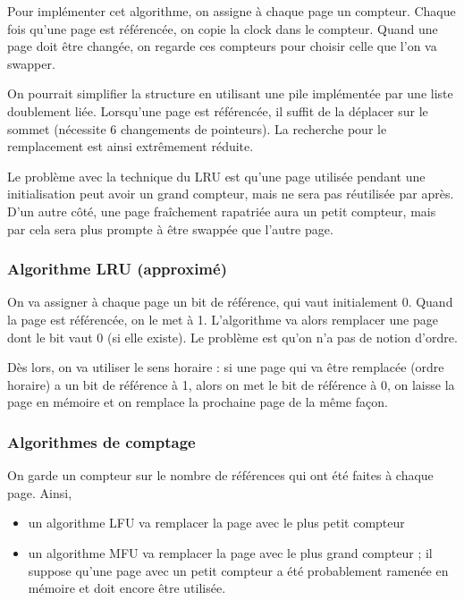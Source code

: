 		
		Pour implémenter cet algorithme, on assigne à chaque page un compteur. Chaque fois qu'une page est référencée, on copie la clock dans le compteur. Quand une page doit être changée, on regarde ces compteurs pour choisir celle que l'on va swapper.
		
		On pourrait simplifier la structure en utilisant une pile implémentée par une liste doublement liée. Lorsqu'une page est référencée, il suffit de la déplacer sur le sommet (nécessite 6 changements de pointeurs). La recherche pour le remplacement est ainsi extrêmement réduite.
		
		Le problème avec la technique du LRU est qu'une page utilisée pendant une initialisation peut avoir un grand compteur, mais ne sera pas réutilisée par après. D'un autre côté, une page fraîchement rapatriée aura un petit compteur, mais par cela sera plus prompte à être swappée que l'autre page.
		
		\subsubsection{Algorithme LRU (approximé)}
		
		On va assigner à chaque page un bit de référence, qui vaut initialement 0. Quand la page est référencée, on le met à 1. L'algorithme va alors remplacer une page dont le bit vaut 0 (si elle existe). Le problème est qu'on n'a pas de notion d'ordre.
		
		Dès lors, on va utiliser le sens horaire : si une page qui va être remplacée (ordre horaire) a un bit de référence à 1, alors on met le bit de référence à 0, on laisse la page en mémoire et on remplace la prochaine page de la même façon.
		
		
		
		\subsubsection{Algorithmes de comptage}
		
		On garde un compteur sur le nombre de références qui ont été faites à chaque page. Ainsi,
		
		\begin{itemize}
			\item un algorithme LFU va remplacer la page avec le plus petit compteur
			\item un algorithme MFU va remplacer la page avec le plus grand compteur ; il suppose qu'une page avec un petit compteur a été probablement ramenée en mémoire et doit encore être utilisée.
		\end{itemize}
		
